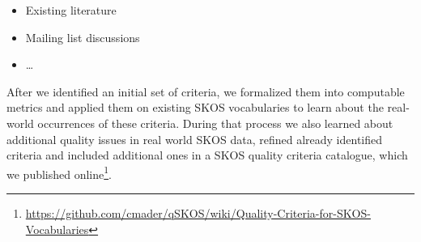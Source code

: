 \begin{itemize}
    \item Existing literature
    \item Mailing list discussions
    \item \ldots {}
\end{itemize}

After we identified an initial set of criteria, we formalized them into computable metrics and applied them on existing SKOS vocabularies to learn about the real-world occurrences of these criteria. During that process we also learned about additional quality issues in real world SKOS data, refined already identified criteria and included additional ones in a SKOS quality criteria catalogue, which we published online\footnote{\url{https://github.com/cmader/qSKOS/wiki/Quality-Criteria-for-SKOS-Vocabularies}}.

